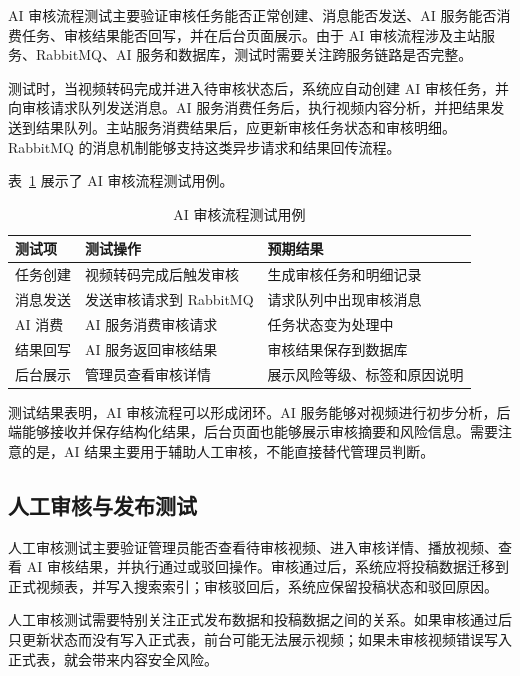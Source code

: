 AI 审核流程测试主要验证审核任务能否正常创建、消息能否发送、AI 服务能否消费任务、审核结果能否回写，并在后台页面展示。由于 AI 审核流程涉及主站服务、RabbitMQ、AI 服务和数据库，测试时需要关注跨服务链路是否完整。

测试时，当视频转码完成并进入待审核状态后，系统应自动创建 AI 审核任务，并向审核请求队列发送消息。AI 服务消费任务后，执行视频内容分析，并把结果发送到结果队列。主站服务消费结果后，应更新审核任务状态和审核明细。RabbitMQ 的消息机制能够支持这类异步请求和结果回传流程\cite{rabbitmqdocs}。

表~\ref{tab:ai-audit-test} 展示了 AI 审核流程测试用例。

\begin{table}[htbp]
  \centering
  \caption{AI 审核流程测试用例}
  \label{tab:ai-audit-test}
  \begin{tabular}{p{}p{}p{}}
    \hline
    \textbf{测试项} & \textbf{测试操作} & \textbf{预期结果} \\
    \hline
    任务创建 & 视频转码完成后触发审核 & 生成审核任务和明细记录 \\
    消息发送 & 发送审核请求到 RabbitMQ & 请求队列中出现审核消息 \\
    AI 消费 & AI 服务消费审核请求 & 任务状态变为处理中 \\
    结果回写 & AI 服务返回审核结果 & 审核结果保存到数据库 \\
    后台展示 & 管理员查看审核详情 & 展示风险等级、标签和原因说明 \\
    \hline
  \end{tabular}
\end{table}

测试结果表明，AI 审核流程可以形成闭环。AI 服务能够对视频进行初步分析，后端能够接收并保存结构化结果，后台页面也能够展示审核摘要和风险信息。需要注意的是，AI 结果主要用于辅助人工审核，不能直接替代管理员判断。

\subsection{人工审核与发布测试}
\label{subsec:manual-audit-publish-test}

人工审核测试主要验证管理员能否查看待审核视频、进入审核详情、播放视频、查看 AI 审核结果，并执行通过或驳回操作。审核通过后，系统应将投稿数据迁移到正式视频表，并写入搜索索引；审核驳回后，系统应保留投稿状态和驳回原因。

人工审核测试需要特别关注正式发布数据和投稿数据之间的关系。如果审核通过后只更新状态而没有写入正式表，前台可能无法展示视频；如果未审核视频错误写入正式表，就会带来内容安全风险。

